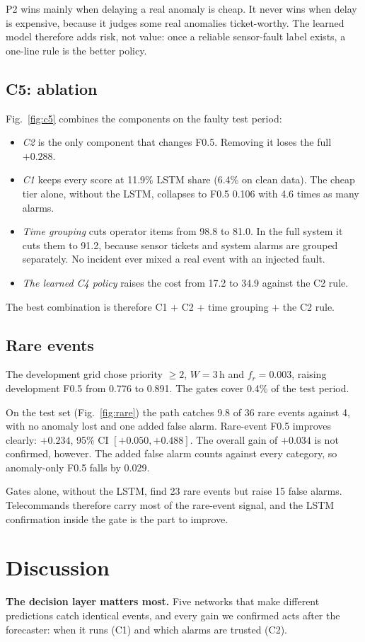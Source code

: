 \documentclass[conference]{IEEEtran}
\begin{document}
P2 wins mainly when delaying a real anomaly is cheap. It never wins when delay is expensive, because it judges some real anomalies ticket-worthy. The learned model therefore adds risk, not value: once a reliable sensor-fault label exists, a one-line rule is the better policy.

\subsection{C5: ablation}
Fig.~\ref{fig:c5} combines the components on the faulty test period:
\begin{itemize}
\item \emph{C2} is the only component that changes F0.5. Removing it loses the full $+0.288$.
\item \emph{C1} keeps every score at 11.9\% LSTM share (6.4\% on clean data). The cheap tier alone, without the LSTM, collapses to F0.5 0.106 with 4.6 times as many alarms.
\item \emph{Time grouping} cuts operator items from 98.8 to 81.0. In the full system it cuts them to 91.2, because sensor tickets and system alarms are grouped separately. No incident ever mixed a real event with an injected fault.
\item \emph{The learned C4 policy} raises the cost from 17.2 to 34.9 against the C2 rule.
\end{itemize}
The best combination is therefore C1 + C2 + time grouping + the C2 rule.

\subsection{Rare events}
The development grid chose priority $\geq 2$, $W=3$\,h and $f_r=0.003$, raising development F0.5 from 0.776 to 0.891. The gates cover 0.4\% of the test period.

On the test set (Fig.~\ref{fig:rare}) the path catches 9.8 of 36 rare events against 4, with no anomaly lost and one added false alarm. Rare-event F0.5 improves clearly: $+0.234$, 95\% CI $[+0.050, +0.488]$. The overall gain of $+0.034$ is not confirmed, however. The added false alarm counts against every category, so anomaly-only F0.5 falls by 0.029.

Gates alone, without the LSTM, find 23 rare events but raise 15 false alarms. Telecommands therefore carry most of the rare-event signal, and the LSTM confirmation inside the gate is the part to improve.

\section{Discussion}
\textbf{The decision layer matters most.} Five networks that make different predictions catch identical events, and every gain we confirmed acts after the forecaster: when it runs (C1) and which alarms are trusted (C2).
\end{document}
